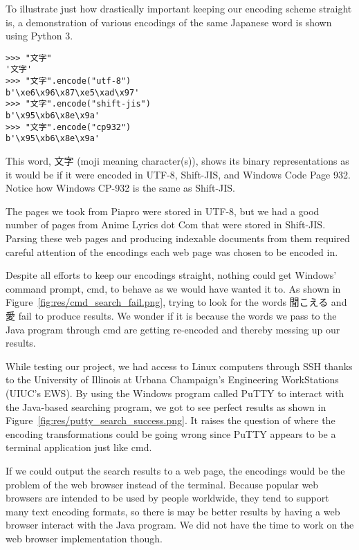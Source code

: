 \documentclass{acm} %
\begin{document}
\begin{CJK}{UTF8}{zhsong}
To illustrate just how drastically important keeping our encoding scheme straight is, a demonstration of various encodings of the same Japanese word is shown using Python 3.

\begin{verbatim}
>>> "文字"
'文字'
>>> "文字".encode("utf-8")
b'\xe6\x96\x87\xe5\xad\x97'
>>> "文字".encode("shift-jis")
b'\x95\xb6\x8e\x9a'
>>> "文字".encode("cp932")
b'\x95\xb6\x8e\x9a'
\end{verbatim}

This word, 文字 (moji meaning character(s)), shows its binary representations as it would be if it were encoded in UTF-8, Shift-JIS, and Windows Code Page 932. Notice how Windows CP-932 is the same as Shift-JIS.

The pages we took from Piapro were stored in UTF-8, but we had a good number of pages from Anime Lyrics dot Com that were stored in Shift-JIS. Parsing these web pages and producing indexable documents from them required careful attention of the encodings each web page was chosen to be encoded in.

Despite all efforts to keep our encodings straight, nothing could get Windows' command prompt, cmd, to behave as we would have wanted it to. As shown in Figure~\ref{fig:res/cmd_search_fail.png}, trying to look for the words 聞こえる and 愛 fail to produce results. We wonder if it is because the words we pass to the Java program through cmd are getting re-encoded and thereby messing up our results.


While testing our project, we had access to Linux computers through SSH thanks to the University of Illinois at Urbana Champaign's Engineering WorkStations (UIUC's EWS). By using the Windows program called PuTTY to interact with the Java-based searching program, we got to see perfect results as shown in Figure~\ref{fig:res/putty_search_success.png}. It raises the question of where the encoding transformations could be going wrong since PuTTY appears to be a terminal application just like cmd.


If we could output the search results to a web page, the encodings would be the problem of the web browser instead of the terminal. Because popular web browsers are intended to be used by people worldwide, they tend to support many text encoding formats, so there is may be better results by having a web browser interact with the Java program. We did not have the time to work on the web browser implementation though.


\end{CJK}
\end{document}

